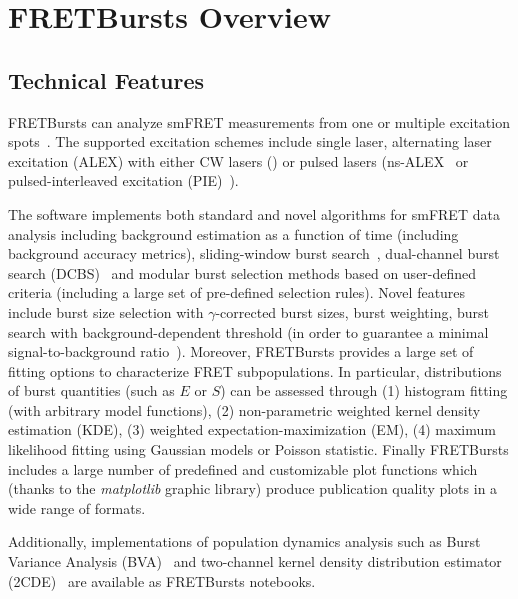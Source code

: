 \section{FRETBursts Overview}
\label{sec:overview}

\subsection{Technical Features}

FRETBursts can analyze smFRET measurements
from one or multiple excitation spots~\cite{Ingargiola_2013}. The supported
excitation schemes include single laser, alternating laser excitation (ALEX)
with either CW lasers (\usalex \cite{Kapanidis_2005})
or pulsed lasers (ns-ALEX~\cite{Laurence_2005} or
pulsed-interleaved excitation (PIE)~\cite{M_ller_2005}).

The software implements both standard and novel algorithms for smFRET data analysis
including background estimation as a function of time (including background accuracy
metrics), sliding-window burst search~\cite{Eggeling_1998}, 
dual-channel burst search (DCBS)~\cite{Nir_2006} and
modular burst selection methods based on user-defined criteria
(including a large set of pre-defined selection rules). Novel features include burst size
selection with $\gamma$-corrected burst sizes, burst weighting, burst search with 
background-dependent threshold (in order to guarantee a minimal signal-to-background 
ratio~\cite{Michalet_2012}).
Moreover, FRETBursts provides a large set of fitting options to characterize FRET subpopulations. 
In particular, distributions of burst quantities (such as $E$ or $S$) can be assessed
through (1) histogram fitting (with arbitrary model functions),
(2) non-parametric weighted kernel density estimation (KDE), (3) weighted
expectation-maximization (EM), (4) maximum likelihood fitting using Gaussian models
or Poisson statistic. Finally FRETBursts includes a large number of
predefined and customizable plot functions which (thanks to the \textit{matplotlib}
graphic library) produce publication quality plots in a wide range of formats.

Additionally, implementations of population dynamics analysis such 
as Burst Variance Analysis (BVA)~\cite{Torella_2011} and two-channel 
kernel density distribution estimator (2CDE)~\cite{Tomov_2012} 
are available as FRETBursts notebooks.

